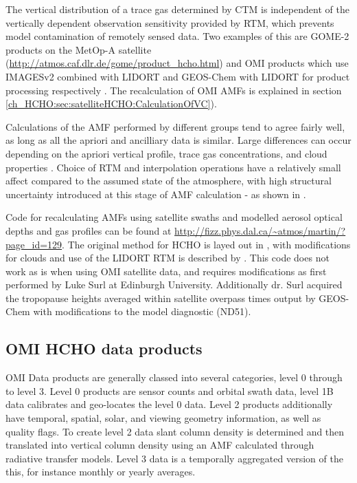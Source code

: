     The vertical distribution of a trace gas determined by CTM is independent of the vertically dependent observation sensitivity provided by RTM, which prevents model contamination of remotely sensed data.
    Two examples of this are GOME-2 products on the MetOp-A satellite (\url{http://atmos.caf.dlr.de/gome/product_hcho.html}) and OMI products which use IMAGESv2 combined with LIDORT and GEOS-Chem with LIDORT for product processing respectively \citep{Chance2002, Abad2015}.
    The recalculation of OMI AMFs is explained in section \ref{ch_HCHO:sec:satelliteHCHO:CalculationOfVC}).
    
    Calculations of the AMF performed by different groups tend to agree fairly well, as long as all the apriori and ancilliary data is similar.
    Large differences can occur depending on the apriori vertical profile, trace gas concentrations, and cloud properties \citep{Lorent2017}.
    Choice of RTM and interpolation operations have a relatively small affect compared to the assumed state of the atmosphere, with high structural uncertainty introduced at this stage of AMF calculation - as shown in \cite{Lorent2017}.

    Code for recalculating AMFs using satellite swaths and modelled aerosol optical depths and gas profiles can be found at \url{http://fizz.phys.dal.ca/~atmos/martin/?page_id=129}. 
    The original method for HCHO is layed out in \cite{Palmer2001}, with modifications for clouds \citep{Martin2002NO} and use of the LIDORT RTM \citep{Spurr2002} is described by \cite{Martin2003NO}.
    This code does not work as is when using OMI satellite data, and requires modifications as first performed by Luke Surl at Edinburgh University.
    Additionally dr. Surl acquired the tropopause heights averaged within satellite overpass times output by GEOS-Chem with modifications to the model diagnostic (ND51).
  
  \subsection{OMI HCHO data products}
    OMI Data products are generally classed into several categories, level 0 through to level 3. Level 0 products are sensor counts and orbital swath data, level 1B data calibrates and geo-locates the level 0 data. Level 2 products additionally have temporal, spatial, solar, and viewing geometry information, as well as quality flags.
    To create level 2 data slant column density is determined and then translated into vertical column density using an AMF calculated through radiative transfer models. Level 3 data is a temporally aggregated version of the this, for instance monthly or yearly averages.
    
